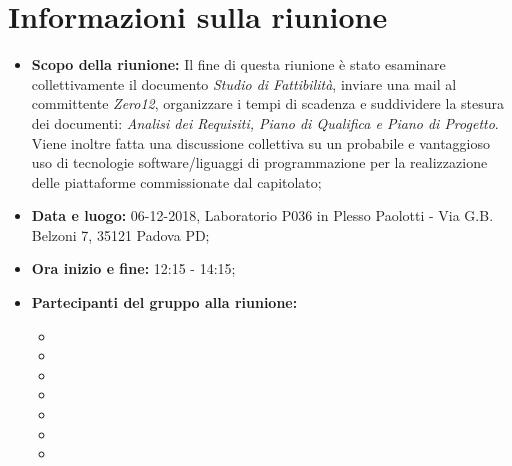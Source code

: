 \clearpage
\section{Informazioni sulla riunione}
\begin{itemize}
	\item \textbf {Scopo della riunione:} Il fine di questa riunione è stato esaminare collettivamente il documento \emph{Studio di Fattibilità}, inviare una mail al committente \emph{Zero12}, organizzare i tempi di scadenza e suddividere la stesura dei documenti: \emph{Analisi dei Requisiti, Piano di Qualifica e Piano di Progetto}. \\
	Viene inoltre fatta una discussione collettiva su un probabile e vantaggioso uso di tecnologie software/liguaggi di programmazione per la realizzazione delle piattaforme commissionate dal capitolato;
	
	\item \textbf {Data e luogo:} 06-12-2018, Laboratorio P036 in Plesso Paolotti - Via G.B. Belzoni 7, 35121 Padova PD;
	
	\item \textbf {Ora inizio e fine:} 12:15 - 14:15;
	
	\item \textbf {Partecipanti del gruppo alla riunione:} 
		 \begin{itemize}
			\item \sonia
			\item \luca
			\item \matteo
			\item \pardeep
			\item \alberto
			\item \alessandro
			\item \andrea
		\end{itemize}
\end{itemize}